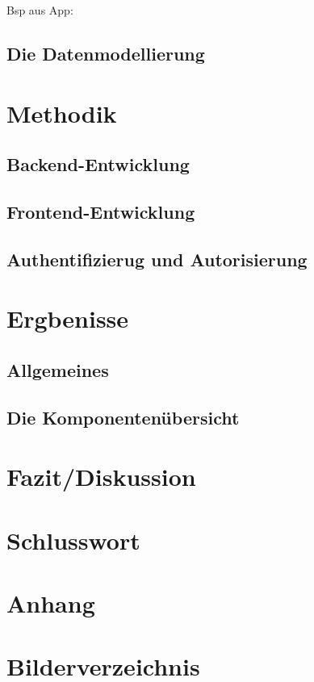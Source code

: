 \documentclass[12pt,a4paper]{article} %
\begin{document}
Bsp aus App:

\subsection{Die Datenmodellierung}

\section{Methodik}
\subsection{Backend-Entwicklung}
\subsection{Frontend-Entwicklung}
\subsection{Authentifizierug und Autorisierung}


\section{Ergbenisse}
\subsection{Allgemeines}
\subsection{Die Komponentenübersicht}
\section{Fazit/Diskussion}
\section{Schlusswort}


\newpage
   
  
\appendix
\section{Anhang}
\newpage





\section{Bilderverzeichnis}
\listoffigures
\end{document}
